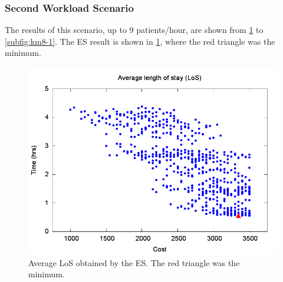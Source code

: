 \subsubsection{Second Workload Scenario}

The results of this scenario, up to 9 patients/hour, are shown from
\ref{subfig:es8-1} to \ref{subfig:km8-1}. The ES result is shown
in \ref{subfig:es8-1}, where the red triangle was the minimum. 
\begin{figure}[H]
\noindent \begin{centering}
\includegraphics[width=0.95\columnwidth,height=0.25\paperheight]{figs4/v0/6400-602-50-exh-LoS-min}
\par\end{centering}

\caption{Average LoS obtained by the ES. The red triangle was the minimum.
\label{subfig:es8-1}}
\end{figure}


